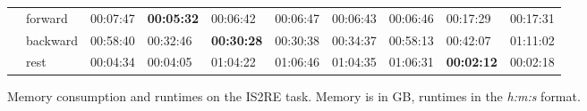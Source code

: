 \begin{figure}[H]
{\begin{tabular}{ll|l|l|l|l|l|l|l|l|}
    \multicolumn{1}{|l|}{}                          & forward     & 00:07:47 & \textbf{00:05:32} & 00:06:42          & 00:06:47 & 00:06:43       & 00:06:46      & 00:17:29          & 00:17:31    \\ \cline{2-10} 
    \multicolumn{1}{|l|}{}                          & backward    & 00:58:40 & 00:32:46          & \textbf{00:30:28} & 00:30:38 & 00:34:37       & 00:58:13      & 00:42:07          & 01:11:02    \\ \cline{2-10} 
    \multicolumn{1}{|l|}{}                          & rest        & 00:04:34 & 00:04:05          & 01:04:22          & 01:06:46 & 01:04:35       & 01:06:31      & \textbf{00:02:12} & 00:02:18    \\ \hline
    \end{tabular}}

    \captionsetup{width=\dimexpr\textwidth-1.5cm\relax}
    \caption{Memory consumption and runtimes on the IS2RE task. Memory is in GB, runtimes in the \textit{h:m:s} format.}
    
\end{figure}

